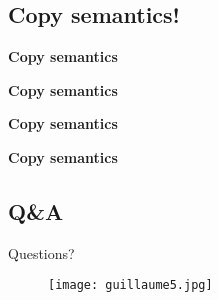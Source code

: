 \subsection*{Copy semantics!}
\begin{frame}\textbf{{Copy semantics}}
    
\end{frame}

\begin{frame}\textbf{{Copy semantics}}
    
\end{frame}
\begin{frame}\textbf{{Copy semantics}}
    
\end{frame}
\begin{frame}\textbf{{Copy semantics}}
    
\end{frame}




\subsection*{Q\&A}
\begin{frame}{Questions?}
    \begin{figure}
        \centering
        \texttt{[image: guillaume5.jpg]}
    \end{figure}
\end{frame}